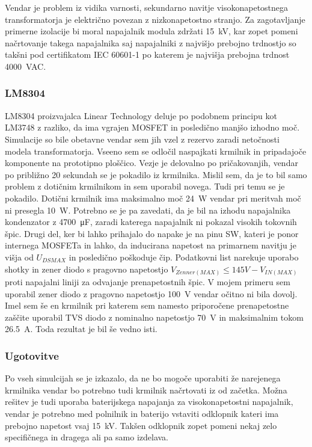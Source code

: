 \documentclass[a4paper,twoside,openright,12pt,slovene]{book}
\begin{document}
Vendar je problem iz vidika varnosti, sekundarno navitje visokonapetostnega transformatorja je električno povezan z nizkonapetostno stranjo. Za zagotavljanje primerne izolacije bi moral napajalnik modula zdržati \SI{15}{\kilo\volt}, kar zopet pomeni načrtovanje takega napajalnika saj napajalniki z najvišjo prebojno trdnostjo so takšni pod certifikatom IEC 60601-1 po katerem je najvišja prebojna trdnost \SI{4000}{\volt}AC.

	\subsubsection{LM8304} \label{LM8304}
LM8304 proizvajalca Linear Technology deluje po podobnem principu kot LM3748 z razliko, da ima vgrajen MOSFET in posledično manjšo izhodno moč. Simulacije so bile obetavne vendar sem jih vzel z rezervo zaradi netočnosti modela transformatorja. Vseeno sem se odločil naspajkati krmilnik in pripadajoče komponente na prototipno ploščico. Vezje je delovalno po pričakovanjih, vendar po približno 20 sekundah se je pokadilo iz krmilnika. Mislil sem, da je to bil samo problem z dotičnim krmilnikom in sem uporabil novega. Tudi pri temu se je pokadilo. Dotični krmilnik ima maksimalno moč \SI{24}{\watt} vendar pri meritvah moč ni presegla \SI{10}{\watt}. Potrebno se je pa zavedati, da je bil na izhodu napajalnika kondenzator z \SI{4700}{\micro\farad}, zaradi katerega napajalnik ni pokazal visokih tokovnih špic. Drugi del, ker bi lahko prihajalo do napake je na pinu SW, kateri je ponor internega MOSFETa in lahko, da inducirana napetost na primarnem navitju je višja od \(U_{DS MAX}\) in posledično poškoduje čip. Podatkovni list narekuje uporabo shotky in zener diodo s pragovno napetostjo \(V_{Zenner(MAX)} \leq 145V - V_{IN(MAX)}\) proti napajalni liniji za odvajanje prenapetostnih špic. V mojem primeru sem uporabil zener diodo z pragovno napetostjo \SI{100}{\volt} vendar očitno ni bila dovolj. Imel sem še en krmilnik pri katerem sem namesto priporočene prenapetostne zaščite uporabil TVS diodo z nominalno napetostjo \SI{70}{\volt} in maksimalnim tokom \SI{26.5}{\ampere}. Toda rezultat je bil še vedno isti.

    \subsubsection{Ugotovitve} \label{Ugotovitve}
Po vseh simulcijah se je izkazalo, da ne bo mogoče uporabiti že narejenega krmilnika vendar bo potrebno tudi krmilnik načrtovati iz od začetka. Možna rešitev je tudi uporaba baterijskega napajanja za visokonapetostni napajalnik, vendar je potrebno med polnilnik in baterijo vstaviti odklopnik kateri ima prebojno napetost vsaj \SI{15}{\kilo\volt}. Takšen odklopnik zopet pomeni nekaj zelo specifičnega in dragega ali pa samo izdelava.
\end{document}
